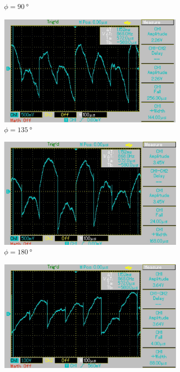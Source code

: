 \begin{figure}[H]
\begin{subfigure}{0.3\textwidth}
    \caption{$\phi = \SI{90}{\degree}$}
  \end{subfigure}
  \begin{subfigure}{0.3\textwidth}
    \centering
    \includegraphics[width=\textwidth]{build/n135.jpg}
    \caption{$\phi = \SI{135}{\degree}$}
  \end{subfigure}
  \begin{subfigure}{0.3\textwidth}
    \centering
    \includegraphics[width=\textwidth]{build/n180.jpg}
    \caption{$\phi = \SI{180}{\degree}$}
  \end{subfigure}
  \begin{subfigure}{0.3\textwidth}
    \centering
    \includegraphics[width=\textwidth]{build/n225.jpg}

\end{subfigure}
\end{figure}
